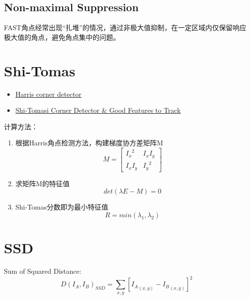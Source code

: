 \subsection{Non-maximal Suppression}
FAST角点经常出现“扎堆”的情况，通过非极大值抑制，在一定区域内仅保留响应极大值的角点，避免角点集中的问题。


\section{Shi-Tomas}
\begin{itemize}
\item \href{https://docs.opencv.org/2.4/doc/tutorials/features2d/trackingmotion/harris_detector/harris_detector.html}{Harris corner detector}
\item \href{https://docs.opencv.org/3.0-beta/doc/py_tutorials/py_feature2d/py_shi_tomasi/py_shi_tomasi.html}{Shi-Tomasi Corner Detector \& Good Features to Track}
\end{itemize}
计算方法：\newline
\begin{enumerate}  
\item 根据Harris角点检测方法，构建梯度协方差矩阵M
\begin{equation}
M =  
\left[\begin{array}{cc}
{I_x}^2&I_xI_y\\I_xI_y&{I_y}^2
\end{array}\right]  
\end{equation}
\item 求矩阵M的特征值
\begin{equation} det(\lambda E - M) = 0 \end{equation}
\item Shi-Tomas分数即为最小特征值
\begin{equation} R=min(\lambda_1,\lambda_2) \end{equation}
\end{enumerate}


\section{SSD}
Sum of Squared Distance: \newline
\begin{equation} {D(I_A,I_B)}_{SSD} = \sum_{x,y}[{I_A}_{(x,y)}-{I_B}_{(x,y)}]^2  \end{equation}


